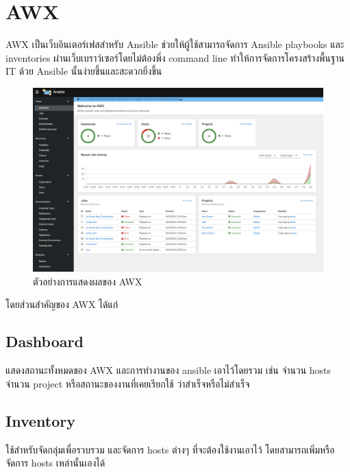 \section{AWX}
\hspace{0.5in} AWX เป็นเว็บอินเตอร์เฟสสำหรับ Ansible ช่วยให้ผู้ใช้สามารถจัดการ Ansible playbooks และ inventories ผ่านเว็บเบราว์เซอร์โดยไม่ต้องพึ่ง command line ทำให้การจัดการโครงสร้างพื้นฐาน IT ด้วย Ansible นั้นง่ายขึ้นและสะดวกยิ่งขึ้น

\begin{figure}[h]
  \begin{center}
    \includegraphics[scale=0.5]{awx.png}
  \end{center}
  \caption[Poem]{ตัวอย่างการแสดงผลของ AWX}
  \label{fig:ansible_playbook}
\end{figure}

\hspace{0.3in} โดยส่วนสำคัญของ AWX ได้แก่


\subsection{Dashboard}
\hspace{0.5in} แสดงสถานะทั้งหมดของ AWX และการทำงานของ ansible เอาไว้โดยรวม เช่น จำนวน hosts จำนวน project หรือสถานะของงานที่เคยเรียกใช้ ว่าสำเร็จหรือไม่สำเร็จ

\subsection{Inventory}
\hspace{0.5in} ใช้สำหรับจัดกลุ่มเพื่อรวบรวม และจัดการ hosts ต่างๆ ที่จะต้องใช้งานเอาไว้ โดยสามารถเพิ่มหรือจัดการ hosts เหล่านั้นเองได้


